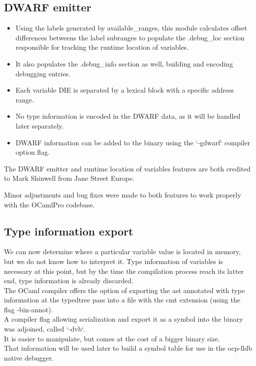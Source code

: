 \subsection{DWARF emitter}

\begin{itemize}
    \item Using the labels generated by available\_ranges, this module calculates offset differences
        betweens the label subranges to populate the .debug\_loc section responsible for
        tracking the runtime location of variables.
    \item It also populates the .debug\_info section as well, building and encoding
        debugging entries.
    \item Each variable DIE is separated by a lexical block with a specific address range.
    \item No type information is encoded in the DWARF data, as it will be handled later separately.
    \item DWARF information can be added to the binary using the `-gdwarf` compiler option flag.
\end{itemize}

The DWARF emitter and runtime location of variables features are both credited to
Mark Shinwell from Jane Street Europe.

Minor adjustments and bug fixes were made to both features to work properly with
the OCamlPro codebase.

\subsection{Type information export}

We can now determine where a particular variable value is located in memory, but
we do not know how to interpret it. Type information of variables is necessary
at this point, but by the time the compilation process reach its latter end,
type information is already discarded. \\

The OCaml compiler offers the option of exporting the \gls{ast} annotated with type
information at the typedtree pass into a file with the cmt extension (using the
flag -bin-annot). \\

A compiler flag allowing serialization and export it as a symbol
into the binary was adjoined, called `-dvb`.\\
It is easier to manipulate, but comes at the cost of a bigger binary
size.\\

That information will be used later to build a symbol table for use in the
ocp-lldb native debugger.

